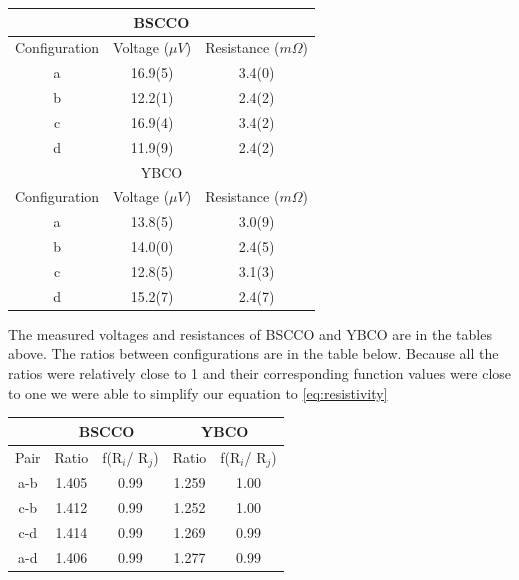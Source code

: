 \documentclass[
reprint,
amsmath,amssymb,
aps,
tikz,
border=5pt
]{revtex4-1}
\begin{document}
    \begin{center}
      \begin{tabular}[t]{ |c|c|c| }
        \hline
        \multicolumn{3}{|c|}{BSCCO} \\
        \hline
        Configuration & Voltage ($\mu V$) & Resistance  ($m\Omega$) \\ 
        \hline
        a & 16.9(5) & 3.4(0)  \\ 
        \hline
        b & 12.2(1) & 2.4(2)  \\ 
        \hline
        c & 16.9(4) & 3.4(2)  \\ 
        \hline
        d & 11.9(9) & 2.4(2)  \\ 
        \hline
        \multicolumn{3}{|c|}{YBCO} \\
        \hline
        Configuration & Voltage ($\mu V$) & Resistance  ($m\Omega$) \\ 
        \hline
        a & 13.8(5) & 3.0(9)  \\ 
        \hline
        b & 14.0(0) & 2.4(5)  \\ 
        \hline
        c & 12.8(5) & 3.1(3) \\ 
        \hline
        d & 15.2(7) & 2.4(7)  \\ 
        \hline
      \end{tabular}
    \end{center}
 

    The measured voltages and resistances of BSCCO and YBCO are in the tables above. The ratios between configurations are in the table below. Because all the ratios were relatively close to 1 and their corresponding function values were close to one we were able to simplify our equation to \ref{eq:resistivity}


    \begin{center}
      \begin{tabular}[b]{ |c|c|c|c|c| }
        \hline
         & \multicolumn{2}{|c|}{BSCCO} & \multicolumn{2}{|c|}{YBCO}\\
        \hline
        Pair & Ratio & f(R$_i$/ R$_j$) & Ratio & f(R$_i$/ R$_j$) \\
        \hline
        a-b & 1.405 & 0.99 & 1.259 & 1.00\\
        \hline
        c-b & 1.412 & 0.99 & 1.252 & 1.00\\
        \hline
        c-d & 1.414 & 0.99 & 1.269 & 0.99\\
        \hline
        a-d & 1.406 & 0.99 & 1.277 & 0.99 \\
        \hline
      \end{tabular}
    \end{center}
\end{document}
